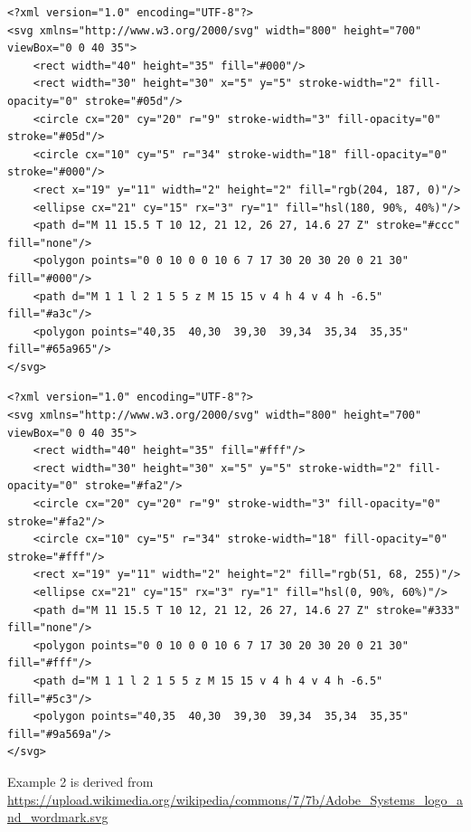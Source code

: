 \documentclass[12pt]{article}
\begin{document}

\begin{verbatim}
<?xml version="1.0" encoding="UTF-8"?>
<svg xmlns="http://www.w3.org/2000/svg" width="800" height="700" viewBox="0 0 40 35">
    <rect width="40" height="35" fill="#000"/>
    <rect width="30" height="30" x="5" y="5" stroke-width="2" fill-opacity="0" stroke="#05d"/>
    <circle cx="20" cy="20" r="9" stroke-width="3" fill-opacity="0" stroke="#05d"/>
    <circle cx="10" cy="5" r="34" stroke-width="18" fill-opacity="0" stroke="#000"/>
    <rect x="19" y="11" width="2" height="2" fill="rgb(204, 187, 0)"/>
    <ellipse cx="21" cy="15" rx="3" ry="1" fill="hsl(180, 90%, 40%)"/>
    <path d="M 11 15.5 T 10 12, 21 12, 26 27, 14.6 27 Z" stroke="#ccc" fill="none"/>
    <polygon points="0 0 10 0 0 10 6 7 17 30 20 30 20 0 21 30" fill="#000"/>
    <path d="M 1 1 l 2 1 5 5 z M 15 15 v 4 h 4 v 4 h -6.5" fill="#a3c"/>
    <polygon points="40,35  40,30  39,30  39,34  35,34  35,35" fill="#65a965"/>
</svg>
\end{verbatim}


\begin{verbatim}
<?xml version="1.0" encoding="UTF-8"?>
<svg xmlns="http://www.w3.org/2000/svg" width="800" height="700" viewBox="0 0 40 35">
    <rect width="40" height="35" fill="#fff"/>
    <rect width="30" height="30" x="5" y="5" stroke-width="2" fill-opacity="0" stroke="#fa2"/>
    <circle cx="20" cy="20" r="9" stroke-width="3" fill-opacity="0" stroke="#fa2"/>
    <circle cx="10" cy="5" r="34" stroke-width="18" fill-opacity="0" stroke="#fff"/>
    <rect x="19" y="11" width="2" height="2" fill="rgb(51, 68, 255)"/>
    <ellipse cx="21" cy="15" rx="3" ry="1" fill="hsl(0, 90%, 60%)"/>
    <path d="M 11 15.5 T 10 12, 21 12, 26 27, 14.6 27 Z" stroke="#333" fill="none"/>
    <polygon points="0 0 10 0 0 10 6 7 17 30 20 30 20 0 21 30" fill="#fff"/>
    <path d="M 1 1 l 2 1 5 5 z M 15 15 v 4 h 4 v 4 h -6.5" fill="#5c3"/>
    <polygon points="40,35  40,30  39,30  39,34  35,34  35,35" fill="#9a569a"/>
</svg>
\end{verbatim}

\vfill
{\scriptsize Example 2 is derived from \url{https://upload.wikimedia.org/wikipedia/commons/7/7b/Adobe_Systems_logo_and_wordmark.svg}}
\end{document}
